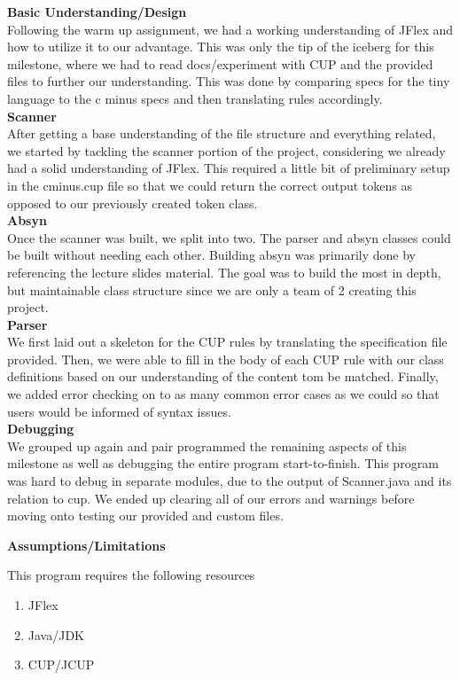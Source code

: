 \documentclass[12pt]{extarticle}
\begin{document}
\textbf{Basic Understanding/Design} \\
Following the warm up assignment, we had a working understanding of JFlex and how to utilize it to our advantage. This was only the tip of the iceberg for this milestone, where we had to read docs/experiment with CUP and the provided files to further our understanding. This was done by comparing specs for the tiny language to the c minus specs and then translating rules accordingly. \\
\textbf{Scanner} \\
After getting a base understanding of the file structure and everything related, we started by tackling the scanner portion of the project, considering we already had a solid understanding of JFlex. This required a little bit of preliminary setup in the cminus.cup file so that we could return the correct output tokens as opposed to our previously created token class. \\
\textbf{Absyn} \\
Once the scanner was built, we split into two. The parser and absyn classes could be built without needing each other. Building absyn was primarily done by referencing the lecture slides material. The goal was to build the most in depth, but maintainable class structure since we are only a team of 2 creating this project. \\
\textbf{Parser} \\
We first laid out a skeleton for the CUP rules by translating the specification file provided. Then, we were able to fill in the body of each CUP rule with our class definitions based on our understanding of the content tom be matched. Finally, we added error checking on to as many common error cases as we could so that users would be informed of syntax issues.\\
\textbf{Debugging} \\
We grouped up again and pair programmed the remaining aspects of this milestone as well as debugging the entire program start-to-finish. This program was hard to debug in separate modules, due to the output of Scanner.java and its relation to cup. We ended up clearing all of our errors and warnings before moving onto testing our provided and custom files.

\textbf{Assumptions/Limitations}

This program requires the following resources
\begin{enumerate}
    \item JFlex
    \item Java/JDK
    \item CUP/JCUP
\end{enumerate}
\end{document}
